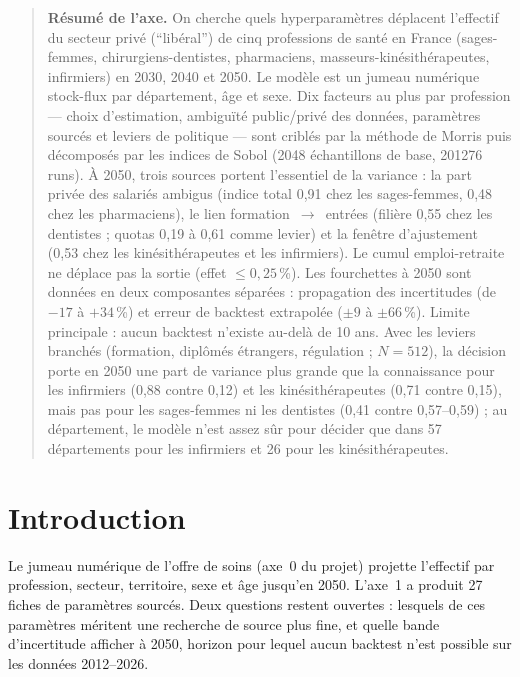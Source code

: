 \begin{quote}\small\textbf{Résumé de l'axe.} On cherche quels hyperparamètres déplacent l'effectif du secteur privé (\enquote{libéral}) de cinq professions de santé
en France (sages-femmes, chirurgiens-dentistes, pharmaciens, masseurs-kinésithérapeutes, infirmiers) en 2030, 2040
et 2050. Le modèle est un jumeau numérique stock-flux par département, âge et sexe. Dix facteurs au plus par
profession --- choix d'estimation, ambiguïté public/privé des données, paramètres sourcés et leviers de politique
--- sont criblés par la méthode de Morris puis décomposés par les indices de Sobol (\num{2048} échantillons de
base, \num{201276}\mesure{} runs). À 2050, trois sources portent l'essentiel de la variance : la part privée des
salariés ambigus (indice total 0,91\mesure{} chez les sages-femmes, 0,48\mesure{} chez les pharmaciens), le lien
formation~$\to$~entrées (filière 0,55\mesure{} chez les dentistes ; quotas 0,19 à 0,61\mesure{} comme levier) et la
fenêtre d'ajustement (0,53\mesure{} chez les kinésithérapeutes et les infirmiers). Le cumul emploi-retraite ne
déplace pas la sortie (effet $\le 0{,}25$\,\%\mesure{}). Les fourchettes à 2050 sont données en deux composantes
séparées : propagation des incertitudes (de $-17$ à $+34$\,\%\mesure{}) et erreur de backtest extrapolée
($\pm 9$ à $\pm 66$\,\%\derive{}). Limite principale : aucun backtest n'existe au-delà de 10 ans. Avec les leviers branchés (formation, diplômés étrangers, régulation ; $N = 512$), la
décision porte en 2050 une part de variance plus grande que la connaissance pour les infirmiers (0,88 contre
0,12\mesure{}) et les kinésithérapeutes (0,71 contre 0,15\mesure{}), mais pas pour les sages-femmes ni les dentistes
(0,41 contre 0,57--0,59\mesure{}) ; au département, le modèle n'est assez sûr pour décider que dans 57\mesure{}
départements pour les infirmiers et 26\mesure{} pour les kinésithérapeutes.\end{quote}

\section{Introduction}
Le jumeau numérique de l'offre de soins (axe~0 du projet) projette l'effectif par profession, secteur, territoire,
sexe et âge jusqu'en 2050. L'axe~1 a produit 27 fiches de paramètres sourcés. Deux questions restent ouvertes :
lesquels de ces paramètres méritent une recherche de source plus fine, et quelle bande d'incertitude afficher à
2050, horizon pour lequel aucun backtest n'est possible sur les données 2012--2026.

